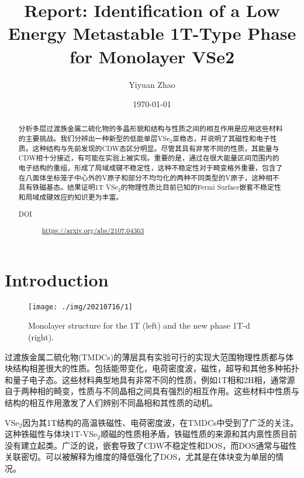 \documentclass[reprint, aps, prb, showkeys]{revtex4-2}
\begin{document}
\title{Report: Identification of a Low Energy Metastable 1T-Type Phase\\ for Monolayer VSe2}

\author{Yiyuan Zhao}
\date{\today}

\begin{abstract}
分析多层过渡族金属二硫化物的多晶形貌和结构与性质之间的相互作用是应用这些材料的主要挑战。我们分辨出一种新型的低能单层VSe$_2$亚稳态，并说明了其磁性和电子性质。这种结构与先前发现的CDW态区分明显。尽管其具有非常不同的性质，其能量与CDW相十分接近，有可能在实验上被实现。重要的是，通过在很大能量区间范围内的电子结构的重组，形成了局域成键不稳定性，这种不稳定性对于畸变格外重要，包含了在八面体坐标笼子中心外的V原子和部分不均匀化的两种不同类型的V原子，这种相不具有铁磁基态。结果证明1T VSe$_2$的物理性质比目前已知的Fermi Surface嵌套不稳定性和局域成键效应的知识更为丰富。

\begin{description}
    \item[DOI] \url{https://arxiv.org/abs/2107.04363}
\end{description}
\end{abstract}


\maketitle

\section{Introduction}
\begin{figure}[t]
    \texttt{[image: ./img/20210716/1]}
    \caption{\label{fig:Structure} 
    Monolayer structure for the 1T (left) and the new phase 1T-d (right).
    }
\end{figure}
过渡族金属二硫化物(TMDCs)的薄层具有实验可行的实现大范围物理性质都与体块结构相差很大的性质。包括能带变化，电荷密度波，磁性，超导和其他多种拓扑和量子电子态。这些材料典型地具有非常不同的性质，例如1T相和2H相，通常源自于两种相的畸变，性质与不同晶相之间具有强烈的相互作用。这些材料中性质与结构的相互作用激发了人们辨别不同晶相和其性质的动机。

VSe$_2$因为其1T结构的高温铁磁性、电荷密度波，在TMDCs中受到了广泛的关注。这种铁磁性与体块1T-VSe$_2$顺磁的性质相矛盾，铁磁性质的来源和其内禀性质目前没有建立起类。广泛的说，嵌套导致了CDW不稳定性和DOS，而DOS通常与磁性关联密切。可以被解释为维度的降低强化了DOS，尤其是在体块变为单层的情况。
\end{document}
